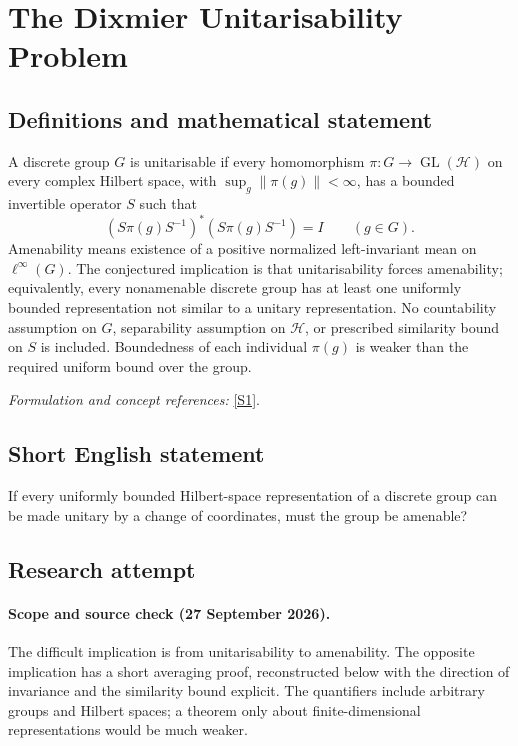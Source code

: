 \documentclass[11pt]{article}
\begin{document}
\section*{\texorpdfstring{The Dixmier Unitarisability Problem}{The Dixmier Unitarisability Problem}}\label{statement}
\subsection{Definitions and mathematical statement}
A discrete group $G$ is unitarisable if every homomorphism $\pi:G\to\operatorname{GL}(\mathcal H)$ on every complex Hilbert space, with $\sup_g\|\pi(g)\|<\infty$, has a bounded invertible operator $S$ such that
\[
 (S\pi(g)S^{-1})^*(S\pi(g)S^{-1})=I\qquad(g\in G).
\]
Amenability means existence of a positive normalized left-invariant mean on $\ell^\infty(G)$. The conjectured implication is that unitarisability forces amenability; equivalently, every nonamenable discrete group has at least one uniformly bounded representation not similar to a unitary representation. No countability assumption on $G$, separability assumption on $\mathcal H$, or prescribed similarity bound on $S$ is included. Boundedness of each individual $\pi(g)$ is weaker than the required uniform bound over the group.
\par\smallskip\textit{Formulation and concept references:} \href{https://arxiv.org/pdf/0902.4585v1}{[S1]}.

\subsection{Short English statement}
If every uniformly bounded Hilbert-space representation of a discrete group can be made unitary by a change of coordinates, must the group be amenable?
\subsection{Research attempt}
\paragraph{Scope and source check (27 September 2026).}
The difficult implication is from unitarisability to amenability. The
opposite implication has a short averaging proof, reconstructed below
with the direction of invariance and the similarity bound explicit.
The quantifiers include arbitrary groups and Hilbert spaces; a theorem
only about finite-dimensional representations would be much weaker.
\end{document}
